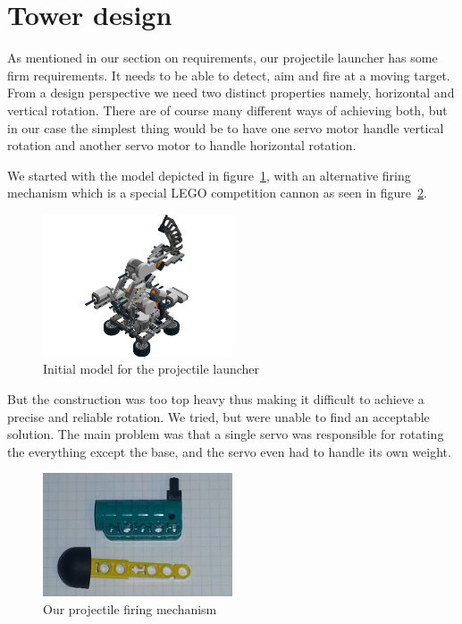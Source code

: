 \section{Tower design}
As mentioned in our section on requirements, our projectile launcher has some firm requirements. It needs to be able to detect, aim and fire at a moving target. 
From a design perspective we need two distinct properties namely, horizontal and vertical rotation. There are of course many different ways of achieving both, but in our case the simplest thing would be to have one servo motor handle vertical rotation and another servo motor to handle horizontal rotation. 

We started with the model depicted in figure~\ref{first_model}, with an alternative firing mechanism which is a special LEGO competition cannon as seen in figure~\ref{competition_cannon}. 

\begin{figure}[hptb]
  \centering
    \includegraphics[width=0.5\textwidth]{img/Step114.png}
  \caption{Initial model for the projectile launcher}
  \label{first_model}
\end{figure}

But the construction was too top heavy thus making it difficult to achieve a precise and reliable rotation. We tried, but were unable to find an acceptable solution. The main problem was that a single servo was responsible for rotating the everything except the base, and the servo even had to handle its own weight. 

\begin{figure}[hptb]
  \centering
    \includegraphics[width=0.5\textwidth]{img/competition_cannon.png}
  \caption{Our projectile firing mechanism}
  \label{competition_cannon}
\end{figure}

